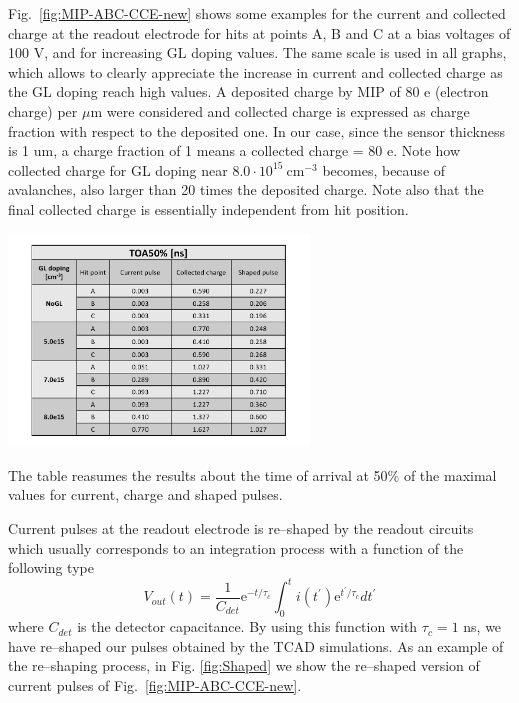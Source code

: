 \documentclass[aps,pt14,superscriptaddress,showpacs,floatfix,nofootinbib]{revtex4}
\begin{document}
Fig.~\ref{fig:MIP-ABC-CCE-new} shows some examples for the current and collected charge at the readout electrode for hits at points A, B and C at a bias voltages of 100 V, and for increasing GL doping values. The same scale is used in all graphs, which allows to clearly appreciate the increase in current and collected charge as the GL doping reach high values. A deposited charge by MIP of 80 e (electron charge) per $\mu$m were considered and collected charge is expressed as charge fraction with respect to the deposited one. In our case, since the sensor thickness is 1 um, a charge fraction of 1 means a collected charge = 80 e. Note how collected charge
for GL doping near $8.0\cdot 10^{15}\ \mathrm{cm^{-3}}$ becomes, because of avalanches, also larger than 20 times the deposited charge. Note also that the final collected charge is essentially independent from hit position. 

\begin{table}[hbtp]
\begin{center}
\vspace{-0.5cm}
\includegraphics[width=0.6\textwidth,keepaspectratio]{figures1/Table_toa50.pdf}
\caption{The table reasumes the results about the time of arrival at 50\% of the maximal values for current, charge and shaped pulses.\label{Table_times}}
\end{center}
\end{table}
 
Current pulses at the readout electrode is re--shaped by the readout circuits which usually corresponds to an integration process with a function of the following type 
$$
V_{out}(t)=\frac{1}{C_{det}}\mathrm{e}^{-t/\tau_c}\int_0^t i(t^\prime)\mathrm{e}^{t^\prime/\tau_c}dt^\prime
$$
where $C_{det}$ is the detector capacitance. By using this function with $\tau_c=1$ ns, we have re--shaped our pulses obtained by the TCAD simulations. As an example of the re--shaping process, in Fig. \ref{fig:Shaped} we show the re--shaped version of current pulses of Fig.~\ref{fig:MIP-ABC-CCE-new}.
\end{document}
